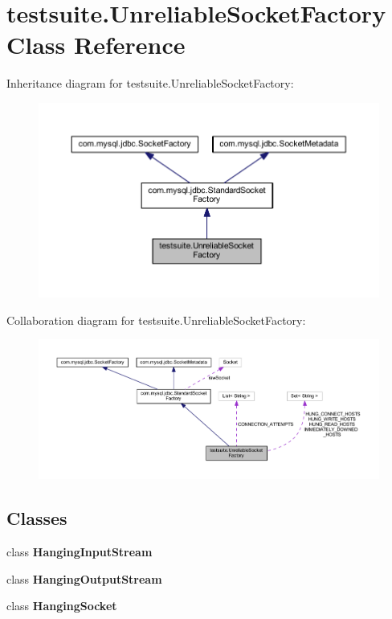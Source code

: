 \hypertarget{classtestsuite_1_1_unreliable_socket_factory}{}\section{testsuite.\+Unreliable\+Socket\+Factory Class Reference}
\label{classtestsuite_1_1_unreliable_socket_factory}


Inheritance diagram for testsuite.\+Unreliable\+Socket\+Factory\+:
\nopagebreak
\begin{figure}[H]
\begin{center}
\leavevmode
\includegraphics[width=350pt]{classtestsuite_1_1_unreliable_socket_factory__inherit__graph}
\end{center}
\end{figure}


Collaboration diagram for testsuite.\+Unreliable\+Socket\+Factory\+:
\nopagebreak
\begin{figure}[H]
\begin{center}
\leavevmode
\includegraphics[width=350pt]{classtestsuite_1_1_unreliable_socket_factory__coll__graph}
\end{center}
\end{figure}
\subsection*{Classes}
\begin{DoxyCompactItemize}
\item 
class {\bfseries Hanging\+Input\+Stream}
\item 
class {\bfseries Hanging\+Output\+Stream}
\item 
class {\bfseries Hanging\+Socket}
\end{DoxyCompactItemize}
